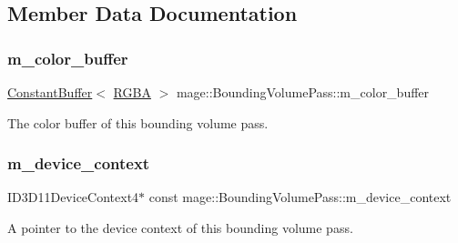 \subsection{Member Data Documentation}
\hypertarget{classmage_1_1_bounding_volume_pass_aeb60ac6a87ba6fdd6a87fb750e2f3d10}{}\label{classmage_1_1_bounding_volume_pass_aeb60ac6a87ba6fdd6a87fb750e2f3d10} 
\subsubsection{\texorpdfstring{m\+\_\+color\+\_\+buffer}{m\_color\_buffer}}
{\footnotesize\ttfamily \hyperlink{classmage_1_1_constant_buffer}{Constant\+Buffer}$<$ \hyperlink{structmage_1_1_r_g_b_a}{R\+G\+BA} $>$ mage\+::\+Bounding\+Volume\+Pass\+::m\+\_\+color\+\_\+buffer\hspace{0.3cm}{\ttfamily [private]}}

The color buffer of this bounding volume pass. \hypertarget{classmage_1_1_bounding_volume_pass_a4ee95284ca70becba75d4be1a19268d7}{}\label{classmage_1_1_bounding_volume_pass_a4ee95284ca70becba75d4be1a19268d7} 
\subsubsection{\texorpdfstring{m\+\_\+device\+\_\+context}{m\_device\_context}}
{\footnotesize\ttfamily I\+D3\+D11\+Device\+Context4$\ast$ const mage\+::\+Bounding\+Volume\+Pass\+::m\+\_\+device\+\_\+context\hspace{0.3cm}{\ttfamily [private]}}

A pointer to the device context of this bounding volume pass. \hypertarget{classmage_1_1_bounding_volume_pass_a07df0f32726f390dd0f060bc6d61b40e}{}\label{classmage_1_1_bounding_volume_pass_a07df0f32726f390dd0f060bc6d61b40e} 
